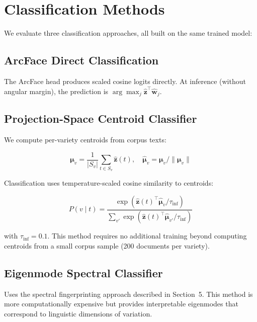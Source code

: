 \documentclass[11pt,a4paper]{article}
\begin{document}
\section{Classification Methods}

We evaluate three classification approaches, all built on the same trained
model:

\subsection{ArcFace Direct Classification}

The ArcFace head produces scaled cosine logits directly. At inference
(without angular margin), the prediction is $\arg\max_j \hat{\mathbf{z}}^\top
\hat{\mathbf{w}}_j$.

\subsection{Projection-Space Centroid Classifier}

We compute per-variety centroids from corpus texts:

\begin{equation}
    \boldsymbol{\mu}_v = \frac{1}{|S_v|} \sum_{t \in S_v}
    \hat{\mathbf{z}}(t), \quad
    \hat{\boldsymbol{\mu}}_v = \boldsymbol{\mu}_v / \|\boldsymbol{\mu}_v\|
\end{equation}

Classification uses temperature-scaled cosine similarity to centroids:

\begin{equation}
    P(v \mid t) = \frac{\exp(\hat{\mathbf{z}}(t)^\top
    \hat{\boldsymbol{\mu}}_v / \tau_{\text{inf}})}
    {\sum_{v'} \exp(\hat{\mathbf{z}}(t)^\top
    \hat{\boldsymbol{\mu}}_{v'} / \tau_{\text{inf}})}
\end{equation}

with $\tau_{\text{inf}} = 0.1$. This method requires no additional training
beyond computing centroids from a small corpus sample (200 documents per
variety).

\subsection{Eigenmode Spectral Classifier}

Uses the spectral fingerprinting approach described in
Section~5. This method is more computationally expensive but provides
interpretable eigenmodes that correspond to linguistic dimensions of variation.
\end{document}
